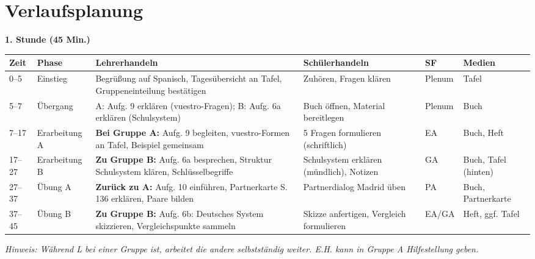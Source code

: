 \documentclass[11pt,a4paper]{article}
\begin{document}
\section{Verlaufsplanung}

\textbf{1. Stunde (45 Min.)}

\begin{longtable}{|p{0.8cm}|p{1.3cm}|p{4.5cm}|p{3cm}|p{1.5cm}|p{2cm}|}
\hline
\textbf{Zeit} & \textbf{Phase} & \textbf{Lehrerhandeln} & \textbf{Schülerhandeln} & \textbf{SF} & \textbf{Medien} \\
\hline
\endhead

0--5 & Einstieg & Begrüßung auf Spanisch, Tagesübersicht an Tafel, Gruppen\-einteilung bestätigen & Zuhören, Fragen klären & Plenum & Tafel \\
\hline

5--7 & Übergang & A: Aufg. 9 erklären (vuestro-Fragen); B: Aufg. 6a erklären (Schulsystem) & Buch öffnen, Material bereitlegen & Plenum & Buch \\
\hline

7--17 & Erarbei\-tung A & \textbf{Bei Gruppe A:} Aufg. 9 begleiten, vuestro-Formen an Tafel, Beispiel gemeinsam & 5 Fragen formulieren (schriftlich) & EA & Buch, Heft \\
\hline

17--27 & Erarbei\-tung B & \textbf{Zu Gruppe B:} Aufg. 6a besprechen, Struktur Schulsystem klären, Schlüsselbegriffe & Schulsystem erklären (mündlich), Notizen & GA & Buch, Tafel (hinten) \\
\hline

27--37 & Übung A & \textbf{Zurück zu A:} Aufg. 10 einführen, Partnerkarte S. 136 erklären, Paare bilden & Partnerdialog Madrid üben & PA & Buch, Partnerkarte \\
\hline

37--45 & Übung B & \textbf{Zu Gruppe B:} Aufg. 6b: Deutsches System skizzieren, Vergleichspunkte sammeln & Skizze anfertigen, Vergleich formulieren & EA/GA & Heft, ggf. Tafel \\
\hline
\end{longtable}

\vspace{0.5em}
\textit{Hinweis: Während L bei einer Gruppe ist, arbeitet die andere selbstständig weiter. E.H. kann in Gruppe A Hilfestellung geben.}
\end{document}
